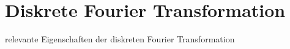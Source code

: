 \chapter{Diskrete Fourier Transformation}
relevante Eigenschaften der diskreten Fourier Transformation